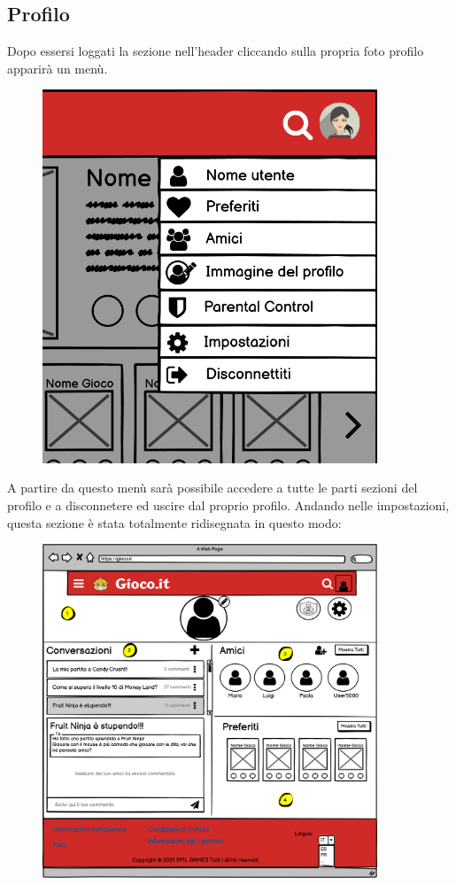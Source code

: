 \documentclass[../Report.tex]{subfiles}
\begin{document}
    \subsection{Profilo}
    Dopo essersi loggati la sezione nell'header cliccando sulla propria foto profilo apparirà un menù.
    \begin{figure}[H]
        \includegraphics[width=10cm]{WProfileMenu.png}
        \centering
    \end{figure}
    A partire da questo menù sarà possibile accedere a tutte le parti sezioni del profilo e a disconnetere ed uscire dal proprio profilo. 
    \label{section: profilo}
    Andando nelle impostazioni, questa sezione è stata totalmente ridisegnata in questo modo:
    \begin{figure}[H]
        \includegraphics[width=10cm]{WProfile.png}
        \centering
    \end{figure}
    
\end{document}
